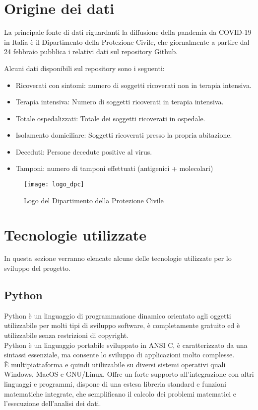 
\section{Origine dei dati}
La principale fonte di dati riguardanti la diffusione della pandemia da COVID-19 in Italia è il Dipartimento della Protezione Civile, che giornalmente a partire dal 24 febbraio pubblica i relativi dati sul repository Github\cite{repository}.

Alcuni dati disponibili sul repository sono i seguenti:
\begin{itemize}
    \item Ricoverati con sintomi: numero di soggetti ricoverati non in terapia intensiva.
    \item Terapia intensiva: Numero di soggetti ricoverati in terapia intensiva.
    \item Totale ospedalizzati: Totale dei soggetti ricoverati in ospedale.
    \item Isolamento domiciliare: Soggetti ricoverati presso la propria abitazione.
    \item Deceduti: Persone decedute positive al virus.
    \item Tamponi: numero di tamponi effettuati (antigenici + molecolari)
\end{itemize}


\begin{figure}[htp]
    \centering
    \texttt{[image: logo\_dpc]}
    \caption{Logo del Dipartimento della Protezione Civile}
\end{figure}


\section{Tecnologie utilizzate}
In questa sezione verranno elencate alcune delle tecnologie utilizzate per lo sviluppo del progetto.

\subsection{Python}
Python è un linguaggio di programmazione dinamico orientato agli oggetti utilizzabile per molti tipi di sviluppo software, è completamente gratuito ed è utilizzabile senza restrizioni di copyright.\\
Python è un linguaggio portabile sviluppato in ANSI C, è caratterizzato da una sintassi essenziale, ma consente lo sviluppo di applicazioni molto complesse.\\
È multipiattaforma e quindi utilizzabile su diversi  sistemi operativi quali Windows, MacOS e GNU/Linux.
Offre un forte supporto all'integrazione con altri linguaggi e programmi, dispone di una estesa libreria standard e funzioni matematiche integrate, che semplificano il calcolo dei problemi matematici e l'esecuzione dell'analisi dei dati.

